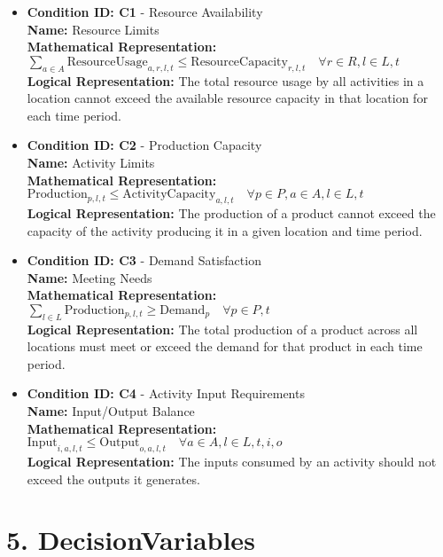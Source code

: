\documentclass{article}
\begin{document}
\begin{itemize}
    \item \textbf{Condition ID: C1} - Resource Availability \\
    \textbf{Name:} Resource Limits \\
    \textbf{Mathematical Representation:} $\sum_{a \in A} \text{ResourceUsage}_{a,r,l,t} \le \text{ResourceCapacity}_{r,l,t} \quad \forall r \in R, l \in L, t$ \\
    \textbf{Logical Representation:} The total resource usage by all activities in a location cannot exceed the available resource capacity in that location for each time period.

    \item \textbf{Condition ID: C2} - Production Capacity \\
    \textbf{Name:} Activity Limits \\
    \textbf{Mathematical Representation:} $\text{Production}_{p,l,t} \le \text{ActivityCapacity}_{a,l,t} \quad \forall p \in P, a \in A, l \in L, t$ \\
    \textbf{Logical Representation:} The production of a product cannot exceed the capacity of the activity producing it in a given location and time period.

    \item \textbf{Condition ID: C3} - Demand Satisfaction \\
    \textbf{Name:} Meeting Needs \\
    \textbf{Mathematical Representation:} $\sum_{l \in L} \text{Production}_{p,l,t} \ge \text{Demand}_p \quad \forall p \in P, t$ \\
    \textbf{Logical Representation:} The total production of a product across all locations must meet or exceed the demand for that product in each time period.

    \item \textbf{Condition ID: C4} - Activity Input Requirements \\
    \textbf{Name:} Input/Output Balance \\
    \textbf{Mathematical Representation:}  $\text{Input}_{i,a,l,t} \le \text{Output}_{o,a,l,t} \quad \forall a \in A, l \in L, t, i,o$ \\
    \textbf{Logical Representation:} The inputs consumed by an activity should not exceed the outputs it generates.
\end{itemize}

\section{5. DecisionVariables}
\end{document}
